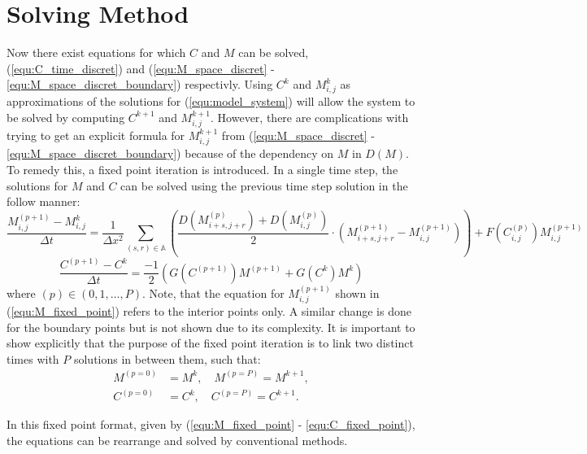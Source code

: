 \section{Solving Method}

Now there exist equations for which $C$ and $M$ can be solved, (\ref{equ:C_time_discret}) and (\ref{equ:M_space_discret} - \ref{equ:M_space_discret_boundary}) respectivly.
Using $C^{k}$ and $M^{k}_{i,j}$ as approximations of the solutions for (\ref{equ:model_system}) will allow the system to be solved by computing $C^{k+1}$ and $M^{k+1}_{i,j}$.
However, there are complications with trying to get an explicit formula for $M^{k+1}_{i,j}$ from (\ref{equ:M_space_discret} - \ref{equ:M_space_discret_boundary}) because of the dependency on $M$ in $D(M)$. 
To remedy this, a fixed point iteration is introduced.
In a single time step, the solutions for $M$ and $C$ can be solved using the previous time step solution in the follow manner:
\begin{equation} \label{equ:M_fixed_point}
  \frac{M^{(p+1)}_{i,j} - M^{k}_{i,j}}{\Delta t} = 
    \frac{1}{\Delta x^2} \sum_{(s,r) \in \mathbb{A}}
    \left( \frac{D(M^{(p)}_{i+s,j+r}) + D(M^{(p)}_{i,j})}{2} \cdot
    ( M^{(p+1)}_{i+s, j+r} - M^{(p+1)}_{i,j}) \right) 
    + F(C^{(p)}_{i,j}) M^{(p+1)}_{i,j}
\end{equation}
\begin{equation} \label{equ:C_fixed_point}
  \frac{C^{(p+1)} - C^{k}}{\Delta t} = \frac{-1}{2} ( G(C^{(p+1)}) M^{(p+1)} + G(C^{k}) M^{k} )
\end{equation}
where $(p) \in (0,1,\ldots,P)$.
Note, that the equation for $M^{(p+1)}_{i,j}$ shown in (\ref{equ:M_fixed_point}) refers to the interior points only.
A similar change is done for the boundary points but is not shown due to its complexity.
It is important to show explicitly that the purpose of the fixed point iteration is to link two distinct times with $P$ solutions in between them, such that:
\begin{equation}
  \begin{aligned}
  M^{(p=0)} &= M^{k}, \quad M^{(p=P)} = M^{k+1}, \\
  C^{(p=0)} &= C^{k}, \quad C^{(p=P)} = C^{k+1}.
  \end{aligned}
\end{equation}

In this fixed point format, given by (\ref{equ:M_fixed_point} - \ref{equ:C_fixed_point}), the equations can be rearrange and solved by conventional methods.

